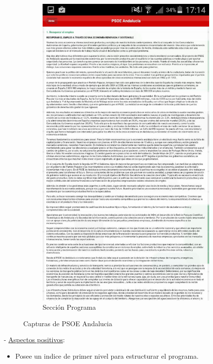 \begin{figure}[H]
\begin{subfigure}[b]{0.3\textwidth}
                \includegraphics[width=\textwidth]{Media/Captures/psoeAndaluciaSection.jpg}
                \caption{Sección Programa}
                \label{fig:psoeSection}
        \end{subfigure}
        \caption{Capturas de PSOE Andalucia}
        \label{fig:psoeAndalucia}
\end{figure}

 - \underline{Aspectos positivos}:

\begin{itemize}
	\item Posee un indice de primer nivel para estructurar el programa.
\end{itemize}

